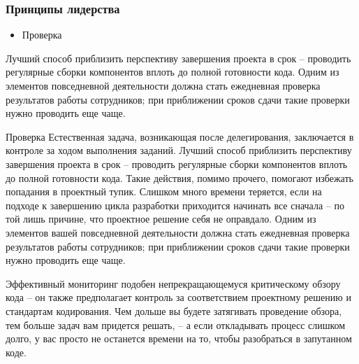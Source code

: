 \documentclass{../industrial-development}
\begin{document}
\begin{frame} \frametitle{Принципы лидерства}
 \begin{block}{}
\begin{itemize}
  \item Проверка
  \end{itemize}
 \end{block}
Лучший способ приблизить перспективу завершения проекта в срок – проводить регулярные сборки компонентов вплоть до полной готовности кода. Одним из элементов  повседневной деятельности должна стать ежедневная проверка результатов работы сотрудников; при приближении сроков сдачи такие проверки нужно проводить еще чаще.  

\end{frame}
\lecturenotes
Проверка
 Естественная задача, возникающая после делегирования, заключается в контроле за ходом выполнения заданий. Лучший способ приблизить перспективу завершения проекта в срок – проводить регулярные сборки компонентов вплоть до полной готовности кода. Такие действия, помимо прочего, помогают избежать попадания в проектный тупик. Слишком много времени теряется, если на подходе к завершению цикла разработки приходится начинать все сначала – по той лишь причине, что проектное решение себя не оправдало. Одним из элементов вашей повседневной деятельности должна стать ежедневная проверка результатов работы сотрудников; при приближении сроков сдачи такие проверки нужно проводить еще чаще.

Эффективный мониторинг подобен непрекращающемуся критическому обзору кода – он также предполагает контроль за соответствием проектному решению и стандартам кодирования. Чем дольше вы будете затягивать проведение обзора, тем больше задач вам придется решать, – а если откладывать процесс слишком долго, у вас просто не останется времени на то, чтобы разобраться в запутанном коде.

~\cite{How_to_be_a_good_IT-manager}
\end{document}
